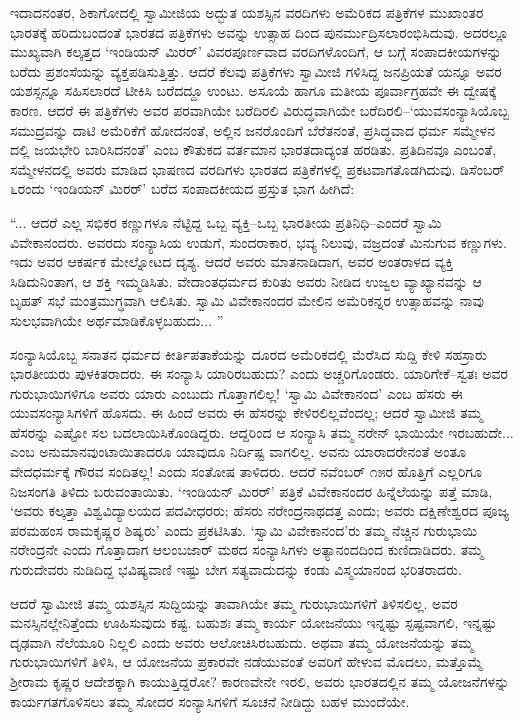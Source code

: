 ಇದಾದನಂತರ, ಶಿಕಾಗೋದಲ್ಲಿ ಸ್ವಾಮೀಜಿಯ ಅದ್ಭುತ ಯಶಸ್ಸಿನ ವರದಿಗಳು ಅಮೆರಿಕದ ಪತ್ರಿಕೆಗಳ ಮುಖಾಂತರ ಭಾರತಕ್ಕೆ ಹರಿದುಬಂದಂತೆ ಭಾರತದ ಪತ್ರಿಕೆಗಳು ಅವನ್ನು ಉತ್ಸಾಹ ದಿಂದ ಪುನರ್ಮುದ್ರಿಸಲಾರಂಭಿಸಿದುವು. ಅದರಲ್ಲೂ ಮುಖ್ಯವಾಗಿ ಕಲ್ಕತ್ತದ ‘ಇಂಡಿಯನ್ ಮಿರರ್​’ ವಿವರಪೂರ್ಣವಾದ ವರದಿಗಳೊಂದಿಗೆ, ಆ ಬಗ್ಗೆ ಸಂಪಾದಕೀಯಗಳನ್ನು ಬರೆದು ಪ್ರಶಂಸೆಯನ್ನು ವ್ಯಕ್ತಪಡಿಸುತ್ತಿತ್ತು. ಆದರೆ ಕೆಲವು ಪತ್ರಿಕೆಗಳು ಸ್ವಾಮೀಜಿ ಗಳಿಸಿದ್ದ ಜನಪ್ರಿಯತೆ ಯನ್ನೂ ಅವರ ಯಶಸ್ಸನ್ನೂ ಸಹಿಸಲಾರದೆ ಟೀಕಿಸಿ ಬರೆದದ್ದೂ ಉಂಟು. ಅಸೂಯೆ ಹಾಗೂ ಮತೀಯ ಪೂರ್ವಾಗ್ರಹವೇ ಈ ದ್ವೇಷಕ್ಕೆ ಕಾರಣ. ಆದರೆ ಈ ಪತ್ರಿಕೆಗಳು ಅವರ ಪರವಾಗಿಯೇ ಬರೆದಿರಲಿ ವಿರುದ್ಧವಾಗಿಯೇ ಬರೆದಿರಲಿ–‘ಯುವಸಂನ್ಯಾಸಿಯೊಬ್ಬ ಸಮುದ್ರವನ್ನು ದಾಟಿ ಅಮೆರಿಕೆಗೆ ಹೋದನಂತೆ, ಅಲ್ಲಿನ ಜನರೊಂದಿಗೆ ಬೆರೆತನಂತೆ, ಪ್ರಸಿದ್ಧವಾದ ಧರ್ಮ ಸಮ್ಮೇಳನ ದಲ್ಲಿ ಜಯಭೇರಿ ಬಾರಿಸಿದನಂತೆ’ ಎಂಬ ಕೌತುಕದ ವರ್ತಮಾನ ಭಾರತದಾದ್ಯಂತ ಹರಡಿತು. ಪ್ರತಿದಿನವೂ ಎಂಬಂತೆ, ಸಮ್ಮೇಳನದಲ್ಲಿ ಅವರು ಮಾಡಿದ ಭಾಷಣದ ವರದಿಗಳು ಭಾರತದ ಪತ್ರಿಕೆಗಳಲ್ಲಿ ಪ್ರಕಟವಾಗತೊಡಗಿದುವು. ಡಿಸೆಂಬರ್ ೬ರಂದು ‘ಇಂಡಿಯನ್ ಮಿರರ್​’ ಬರೆದ ಸಂಪಾದಕೀಯದ ಪ್ರಸ್ತುತ ಭಾಗ ಹೀಗಿದೆ:

“... ಆದರೆ ಎಲ್ಲ ಸಭಿಕರ ಕಣ್ಣುಗಳೂ ನೆಟ್ಟಿದ್ದ ಒಬ್ಬ ವ್ಯಕ್ತಿ–ಒಬ್ಬ ಭಾರತೀಯ ಪ್ರತಿನಿಧಿ–ಎಂದರೆ ಸ್ವಾಮಿ ವಿವೇಕಾನಂದರು. ಅವರದು ಸಂನ್ಯಾಸಿಯ ಉಡುಗೆ, ಸುಂದರಾಕಾರ, ಭವ್ಯ ನಿಲುವು, ವಜ್ರದಂತೆ ಮಿನುಗುವ ಕಣ್ಣುಗಳು. ಇದು ಅವರ ಆಕರ್ಷಕ ಮೇಲ್ನೋಟದ ದೃಶ್ಯ. ಆದರೆ ಅವರು ಮಾತನಾಡಿದಾಗ, ಅವರ ಅಂತರಾಳದ ವ್ಯಕ್ತಿ ಸಿಡಿದುನಿಂತಾಗ, ಆ ಶಕ್ತಿ ಇಮ್ಮಡಿಸಿತು. ವೇದಾಂತಧರ್ಮದ ಕುರಿತು ಅವರು ನೀಡಿದ ಉಜ್ವಲ ವ್ಯಾಖ್ಯಾನವನ್ನು ಆ ಬೃಹತ್ ಸಭೆ ಮಂತ್ರಮುಗ್ಧವಾಗಿ ಆಲಿಸಿತು. ಸ್ವಾಮಿ ವಿವೇಕಾನಂದರ ಮೇಲಿನ ಅಮೆರಿಕನ್ನರ ಉತ್ಸಾಹವನ್ನು ನಾವು ಸುಲಭವಾಗಿಯೇ ಅರ್ಥಮಾಡಿಕೊಳ್ಳಬಹುದು... ”

ಸಂನ್ಯಾಸಿಯೊಬ್ಬ ಸನಾತನ ಧರ್ಮದ ಕೀರ್ತಿಪತಾಕೆಯನ್ನು ದೂರದ ಅಮೆರಿಕದಲ್ಲಿ ಮೆರೆಸಿದ ಸುದ್ದಿ ಕೇಳಿ ಸಹಸ್ರಾರು ಭಾರತೀಯರು ಪುಳಕಿತರಾದರು. ಈ ಸಂನ್ಯಾಸಿ ಯಾರಿರಬಹುದು? ಎಂದು ಅಚ್ಚರಿಗೊಂಡರು. ಯಾರಿಗೇಕೆ–ಸ್ವತಃ ಅವರ ಗುರುಭಾಯಿಗಳಿಗೂ ಅವರು ಯಾರು ಎಂಬುದು ಗೊತ್ತಾಗಲಿಲ್ಲ! ‘ಸ್ವಾಮಿ ವಿವೇಕಾನಂದ’ ಎಂಬ ಹೆಸರು ಈ ಯುವಸಂನ್ಯಾಸಿಗಳಿಗೆ ಹೊಸದು. ಈ ಹಿಂದೆ ಅವರು ಈ ಹೆಸರನ್ನು ಕೇಳಿರಲಿಲ್ಲವೆಂದಲ್ಲ; ಆದರೆ ಸ್ವಾಮೀಜಿ ತಮ್ಮ ಹೆಸರನ್ನು ಎಷ್ಟೋ ಸಲ ಬದಲಾಯಿಸಿಕೊಂಡಿದ್ದರು. ಆದ್ದರಿಂದ ಆ ಸಂನ್ಯಾಸಿ ತಮ್ಮ ನರೇನ್ ಭಾಯಿಯೇ ಇರಬಹುದೇ... ಎಂಬ ಅನುಮಾನವುಂಟಾಯಿತಾದರೂ ಯಾವುದೂ ನಿರ್ದಿಷ್ಟ ವಾಗಲಿಲ್ಲ. ಅವನು ಯಾರಾದರೇನಂತೆ ಅಂತೂ ವೇದಧರ್ಮಕ್ಕೆ ಗೌರವ ಸಂದಿತಲ್ಲ! ಎಂದು ಸಂತೋಷ ತಾಳಿದರು. ಆದರೆ ನವೆಂಬರ್ ೧೫ರ ಹೊತ್ತಿಗೆ ಎಲ್ಲರಿಗೂ ನಿಜಸಂಗತಿ ತಿಳಿದು ಬರುವಂತಾಯಿತು. ‘ಇಂಡಿಯನ್ ಮಿರರ್​’ ಪತ್ರಿಕೆ ವಿವೇಕಾನಂದರ ಹಿನ್ನೆಲೆಯನ್ನು ಪತ್ತೆ ಮಾಡಿ, ‘ಅವರು ಕಲ್ಕತ್ತಾ ವಿಶ್ವವಿದ್ಯಾಲಯದ ಪದವೀಧರರು; ಹೆಸರು ನರೇಂದ್ರನಾಥದತ್ತ ಎಂದು; ಅವರು ದಕ್ಷಿಣೇಶ್ವರದ ಪೂಜ್ಯ ಪರಮಹಂಸ ರಾಮಕೃಷ್ಣರ ಶಿಷ್ಯರು’ ಎಂದು ಪ್ರಕಟಿಸಿತು. ‘ಸ್ವಾಮಿ ವಿವೇಕಾನಂದ’ರು ತಮ್ಮ ನೆಚ್ಚಿನ ಗುರುಭಾಯಿ ನರೇಂದ್ರನೇ ಎಂದು ಗೊತ್ತಾದಾಗ ಆಲಂಬಜಾರ್ ಮಠದ ಸಂನ್ಯಾಸಿಗಳು ಅತ್ಯಾನಂದದಿಂದ ಕುಣಿದಾಡಿದರು. ತಮ್ಮ ಗುರುದೇವರು ನುಡಿದಿದ್ದ ಭವಿಷ್ಯವಾಣಿ ಇಷ್ಟು ಬೇಗ ಸತ್ಯವಾದುದನ್ನು ಕಂಡು ವಿಸ್ಮಯಾನಂದ ಭರಿತರಾದರು.

ಆದರೆ ಸ್ವಾಮೀಜಿ ತಮ್ಮ ಯಶಸ್ಸಿನ ಸುದ್ದಿಯನ್ನು ತಾವಾಗಿಯೇ ತಮ್ಮ ಗುರುಭಾಯಿಗಳಿಗೆ ತಿಳಿಸಲಿಲ್ಲ. ಅವರ ಮನಸ್ಸಿನಲ್ಲೇನಿತ್ತೆಂದು ಊಹಿಸುವುದು ಕಷ್ಟ. ಬಹುಶಃ ತಮ್ಮ ಕಾರ್ಯ ಯೋಜನೆಯು ಇನ್ನಷ್ಟು ಸ್ಪಷ್ಟವಾಗಲಿ, ಇನ್ನಷ್ಟು ದೃಢವಾಗಿ ನೆಲೆಯೂರಿ ನಿಲ್ಲಲಿ ಎಂದು ಅವರು ಆಲೋಚಿಸಿರಬಹುದು. ಅಥವಾ ತಮ್ಮ ಯೋಜನೆಯನ್ನು ತಮ್ಮ ಗುರುಭಾಯಿಗಳಿಗೆ ತಿಳಿಸಿ, ಆ ಯೋಜನೆಯ ಪ್ರಕಾರವೇ ನಡೆಯುವಂತೆ ಅವರಿಗೆ ಹೇಳುವ ಮೊದಲು, ಮತ್ತೊಮ್ಮೆ ಶ್ರೀರಾಮ ಕೃಷ್ಣರ ಆದೇಶಕ್ಕಾಗಿ ಕಾಯುತ್ತಿದ್ದರೋ? ಕಾರಣವೇನೇ ಇರಲಿ, ಅವರು ಭಾರತದಲ್ಲಿನ ತಮ್ಮ ಯೋಜನೆಗಳನ್ನು ಕಾರ್ಯಗತಗೊಳಿಸಲು ತಮ್ಮ ಸೋದರ ಸಂನ್ಯಾಸಿಗಳಿಗೆ ಸೂಚನೆ ನೀಡಿದ್ದು ಬಹಳ ಮುಂದೆಯೇ.

